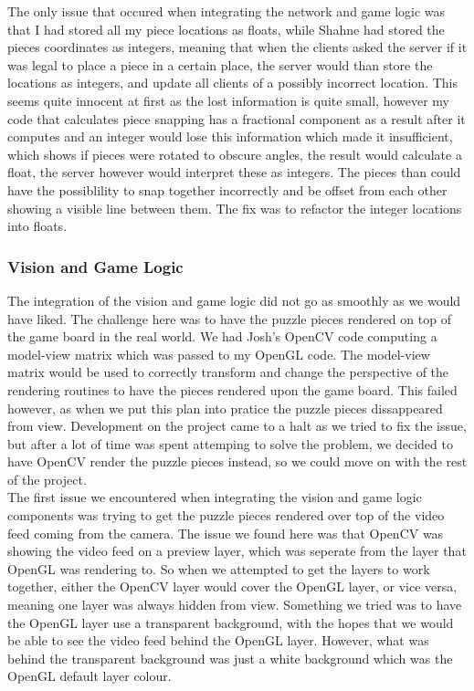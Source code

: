 \documentclass{article}
\begin{document}
The only issue that occured when integrating the network and game logic was that
I had stored all my piece locations as floats, while Shahne had stored the
pieces coordinates as integers, meaning that when the clients asked the server
if it was legal to place a piece in a certain place, the server would than store
the locations as integers, and update all clients of a possibly incorrect
location. This seems quite innocent at first as the lost information is quite
small, however my code that calculates piece snapping has a fractional component
as a result after it computes and an integer would lose this information which
made it insufficient, which shows if pieces were rotated to obscure angles, the
result would calculate a float, the server however would interpret these as
integers. The pieces than could have the possiblility to snap together
incorrectly and be offset from each other showing a visible line between
them. The fix was to refactor the integer locations into floats.

\subsubsection{Vision and Game Logic}
The integration of the vision and game logic did not go as smoothly as we would
have liked. The challenge here was to have the puzzle pieces rendered on top of
the game board in the real world. We had Josh's OpenCV code computing a
model-view matrix which was passed to my OpenGL code. The model-view matrix
would be used to correctly transform and change the perspective of the rendering
routines to have the pieces rendered upon the game board. This failed however,
as when we put this plan into pratice the puzzle pieces dissappeared from
view. Development on the project came to a halt as we tried to fix the issue,
but after a lot of time was spent attemping to solve the problem, we decided to
have OpenCV render the puzzle pieces instead, so we could move on with the rest
of the project.\\

\iffalse
The first issue we encountered when integrating the vision and game logic
components was trying to get the puzzle pieces rendered over top of the video feed
coming from the camera. The issue we found here was that OpenCV was showing the
video feed on a preview layer, which was seperate from the layer that OpenGL was
rendering to. So when we attempted to get the layers to work together, either
the OpenCV layer would cover the OpenGL layer, or vice versa, meaning one layer
was always hidden from view. Something we tried was to have the OpenGL layer use
a transparent background, with the hopes that we would be able to see the video
feed behind the OpenGL layer. However, what was behind the transparent
background was just a white background which was the OpenGL default layer
colour.\\
\end{document}
